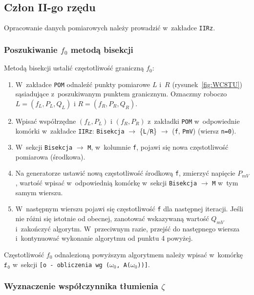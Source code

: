 \documentclass[paper=a4,DIV=12]{lpas}
\begin{document}
\subsection{Człon II-go rzędu}
\label{sec:D53ZC}

Opracowanie danych pomiarowych należy prowadzić w~zakładce \texttt{IIRz}.

\subsubsection{Poszukiwanie $f_0$ metodą bisekcji}
\label{sec:WM5KT}

Metodą bisekcji ustalić częstotliwość graniczną $f_0$:
\begin{enumerate}
  \item W~zakładce \texttt{POM} odnaleźć punkty pomiarowe $L$ i~$R$
    (rysunek~\ref{fig:WC8TU}) sąsiadujące z~poszukiwanym punktem granicznym.
    Oznaczmy roboczo $L = (f_L, P_L, Q_L)$ i $R = (f_R, P_R, Q_R)$.
  \item Wpisać współrzędne $(f_L, P_L)$ i $(f_R, P_R)$ z~zakładki
    \texttt{POM} w~odpowiednie komórki w~zakładce \texttt{IIRz}:
    \texttt{Bisekcja} $\rightarrow$ \{\texttt{L}$/$\texttt{R}\} $\rightarrow$
    (\texttt{f}, \texttt{PmV})  (wiersz \texttt{n=0}).
  \item W~sekcji \texttt{Bisekcja} $\rightarrow$ \texttt{M}, w~kolumnie
    \texttt{f}, pojawi się nowa częstotliwość pomiarowa (środkowa).
  \item Na generatorze ustawić nową częstotliwość środkową \texttt{f}, zmierzyć
    napięcie $P_{mV}$, wartość wpisać w~odpowiednią komórkę w~sekcji
    \texttt{Bisekcja} $\rightarrow$ \texttt{M} w~tym samym wierszu.
  \item W~następnym wierszu pojawi się częstotliwość \texttt{f} dla następnej
    iteracji. Jeśli nie różni się istotnie od obecnej, zanotować wskazywaną
    wartość $Q_{mV}$ i~zakończyć algorytm. W~przeciwnym razie, przejść do
    następnego wiersza i~kontynuować wykonanie algorytmu od punktu 4 powyżej.
\end{enumerate}

Częstotliwość $f_0$ odnalezioną powyższym algorytmem należy wpisać
w~komórkę $\texttt{f}_\texttt{0}$ w~sekcji \texttt{[o - obliczenia wg
($\omega_0$, A($\omega_0$))]}.

\subsubsection{Wyznaczenie współczynnika tłumienia $\zeta$}
\label{eq:A20W9}
\end{document}
